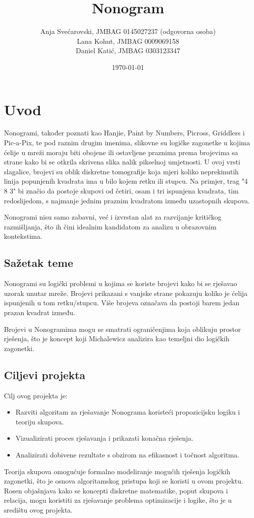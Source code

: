 \documentclass[a4paper,12pt]{article}
\title{\Huge Nonogram}
\author{
Anja Svećarovski, JMBAG 0145027237 (odgovorna osoba)\\
Lana Kohut, JMBAG 0009069158 \\
Daniel Katić, JMBAG 0303123347
}
\date{\today}
\begin{document}
\maketitle
\clearpage
    
\tableofcontents
\clearpage
    
\section{Uvod}
Nonogrami, također poznati kao Hanjie, Paint by Numbers, Picross, Griddlers i Pic-a-Pix, te pod raznim drugim imenima, slikovne su logičke zagonetke u kojima ćelije u mreži moraju biti obojene ili ostavljene praznima prema brojevima sa strane kako bi se otkrila skrivena slika nalik pikselnoj umjetnosti. U ovoj vrsti slagalice, brojevi su oblik diskretne tomografije koja mjeri koliko neprekinutih linija popunjenih kvadrata ima u bilo kojem retku ili stupcu. Na primjer, trag "4 8 3" bi značio da postoje skupovi od četiri, osam i tri ispunjena kvadrata, tim redoslijedom, s najmanje jednim praznim kvadratom između uzastopnih skupova.

Nonogrami nisu samo zabavni, već i izvrstan alat za razvijanje kritičkog razmišljanja, što ih čini idealnim kandidatom za analizu u obrazovnim kontekstima\cite{knjiga2}.

\subsection{Sažetak teme}
Nonogrami su logički problemi u kojima se koriste brojevi kako bi se rješavao uzorak unutar mreže. Brojevi prikazani s vanjske strane pokazuju koliko je ćelija ispunjenih u tom retku/stupcu. Više brojeva označava da postoji barem jedan prazan kvadrat između.

Brojevi u Nonogramima mogu se smatrati ograničenjima koja oblikuju prostor rješenja, što je koncept koji Michalewicz analizira kao temeljni dio logičkih zagonetki\cite{knjiga2}.

\subsection{Ciljevi projekta}
Cilj ovog projekta je:
\begin{itemize}
    \item Razviti algoritam za rješavanje Nonograma koristeći propozicijsku logiku i teoriju skupova.
    \item Vizualizirati proces rješavanja i prikazati konačna rješenja.
    \item Analizirati dobivene rezultate s obzirom na efikasnost i točnost algoritma.
\end{itemize}
Teorija skupova omogućuje formalno modeliranje mogućih rješenja logičkih zagonetki, što je osnova algoritamskog pristupa koji se koristi u ovom projektu. Rosen objašnjava kako se koncepti diskretne matematike, poput skupova i relacija, mogu koristiti za rješavanje problema optimizacije i logike, što je u središtu ovog projekta\cite{knjiga1}.
\end{document}
